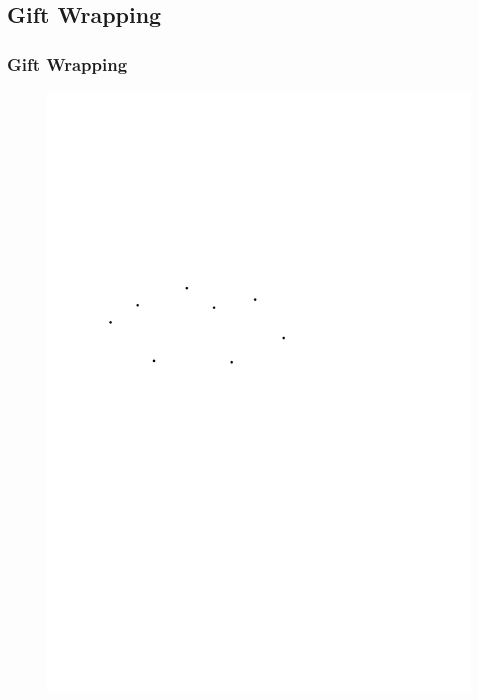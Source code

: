 \subsection{Gift Wrapping}
\begin{frame}
	\frametitle{{Gift Wrapping}}
\begin{figure}[htbp]
	\begin{center}
  	\includegraphics[width=.8\linewidth]{bilder/punkte}
	\end{center}
\end{figure}
\end{frame}

